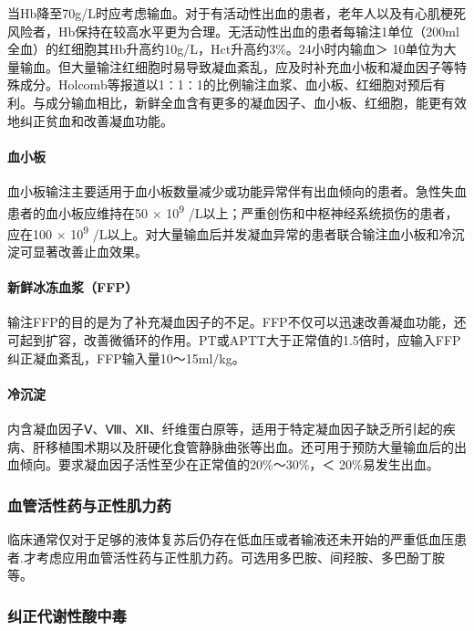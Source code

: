 当Hb降至70g/L时应考虑输血。对于有活动性出血的患者，老年人以及有心肌梗死风险者，Hb保持在较高水平更为合理。无活动性出血的患者每输注1单位（200ml全血）的红细胞其Hb升高约10g/L，Hct升高约3\%。24小时内输血＞
10单位为大量输血。但大量输注红细胞时易导致凝血紊乱，应及时补充血小板和凝血因子等特殊成分。Holcomb等报道以1∶1∶1的比例输注血浆、血小板、红细胞对预后有利。与成分输血相比，新鲜全血含有更多的凝血因子、血小板、红细胞，能更有效地纠正贫血和改善凝血功能。

\paragraph{血小板}

血小板输注主要适用于血小板数量减少或功能异常伴有出血倾向的患者。急性失血患者的血小板应维持在50
× 10\textsuperscript{9}
/L以上；严重创伤和中枢神经系统损伤的患者，应在100 ×
10\textsuperscript{9}
/L以上。对大量输血后并发凝血异常的患者联合输注血小板和冷沉淀可显著改善止血效果。

\paragraph{新鲜冰冻血浆（FFP）}

输注FFP的目的是为了补充凝血因子的不足。FFP不仅可以迅速改善凝血功能，还可起到扩容，改善微循环的作用。PT或APTT大于正常值的1.5倍时，应输入FFP纠正凝血紊乱，FFP输入量10～15ml/kg。

\paragraph{冷沉淀}

内含凝血因子Ⅴ、Ⅷ、Ⅻ、纤维蛋白原等，适用于特定凝血因子缺乏所引起的疾病、肝移植围术期以及肝硬化食管静脉曲张等出血。还可用于预防大量输血后的出血倾向。要求凝血因子活性至少在正常值的20\%～30\%，＜
20\%易发生出血。

\subsubsection{血管活性药与正性肌力药}

临床通常仅对于足够的液体复苏后仍存在低血压或者输液还未开始的严重低血压患者.才考虑应用血管活性药与正性肌力药。可选用多巴胺、间羟胺、多巴酚丁胺等。

\subsubsection{纠正代谢性酸中毒}

